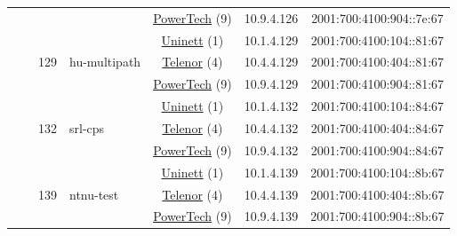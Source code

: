 \begin{small}
\begin{center}
\begin{longtable}{|c|c|c|c|c|c|c|c|}
  &  &  &  & \multicolumn{2}{|c|}{\tiny{\href{http://www.powertech.no}{PowerTech} (9)}} & \tiny{10.9.4.126} & \tiny{2001:700:4100:904::7e:67} \\* \cline{3-3}\cline{4-4}\cline{5-5}\cline{6-6}\cline{7-7}\cline{8-8}
  &  & \multirow{3}{*}{\tiny{129}} & \multicolumn{1}{|l|}{\multirow{3}{*}{\tiny{hu-multipath}}} & \multicolumn{2}{|c|}{\tiny{\href{https://www.uninett.no}{Uninett} (1)}} & \tiny{10.1.4.129} & \tiny{2001:700:4100:104::81:67} \\* \cline{5-5}\cline{6-6}\cline{7-7}\cline{8-8}
  &  &  &  & \multicolumn{2}{|c|}{\tiny{\href{https://www.telenor.no}{Telenor} (4)}} & \tiny{10.4.4.129} & \tiny{2001:700:4100:404::81:67} \\* \cline{5-5}\cline{6-6}\cline{7-7}\cline{8-8}
  &  &  &  & \multicolumn{2}{|c|}{\tiny{\href{http://www.powertech.no}{PowerTech} (9)}} & \tiny{10.9.4.129} & \tiny{2001:700:4100:904::81:67} \\* \cline{3-3}\cline{4-4}\cline{5-5}\cline{6-6}\cline{7-7}\cline{8-8}
  &  & \multirow{3}{*}{\tiny{132}} & \multicolumn{1}{|l|}{\multirow{3}{*}{\tiny{srl-cps}}} & \multicolumn{2}{|c|}{\tiny{\href{https://www.uninett.no}{Uninett} (1)}} & \tiny{10.1.4.132} & \tiny{2001:700:4100:104::84:67} \\* \cline{5-5}\cline{6-6}\cline{7-7}\cline{8-8}
  &  &  &  & \multicolumn{2}{|c|}{\tiny{\href{https://www.telenor.no}{Telenor} (4)}} & \tiny{10.4.4.132} & \tiny{2001:700:4100:404::84:67} \\* \cline{5-5}\cline{6-6}\cline{7-7}\cline{8-8}
  &  &  &  & \multicolumn{2}{|c|}{\tiny{\href{http://www.powertech.no}{PowerTech} (9)}} & \tiny{10.9.4.132} & \tiny{2001:700:4100:904::84:67} \\* \cline{3-3}\cline{4-4}\cline{5-5}\cline{6-6}\cline{7-7}\cline{8-8}
  &  & \multirow{3}{*}{\tiny{139}} & \multicolumn{1}{|l|}{\multirow{3}{*}{\tiny{ntnu-test}}} & \multicolumn{2}{|c|}{\tiny{\href{https://www.uninett.no}{Uninett} (1)}} & \tiny{10.1.4.139} & \tiny{2001:700:4100:104::8b:67} \\* \cline{5-5}\cline{6-6}\cline{7-7}\cline{8-8}
  &  &  &  & \multicolumn{2}{|c|}{\tiny{\href{https://www.telenor.no}{Telenor} (4)}} & \tiny{10.4.4.139} & \tiny{2001:700:4100:404::8b:67} \\* \cline{5-5}\cline{6-6}\cline{7-7}\cline{8-8}
  &  &  &  & \multicolumn{2}{|c|}{\tiny{\href{http://www.powertech.no}{PowerTech} (9)}} & \tiny{10.9.4.139} & \tiny{2001:700:4100:904::8b:67} \\* \cline{3-3}\cline{4-4}\cline{5-5}\cline{6-6}\cline{7-7}\cline{8-8}

\end{longtable}
\end{center}
\end{small}
